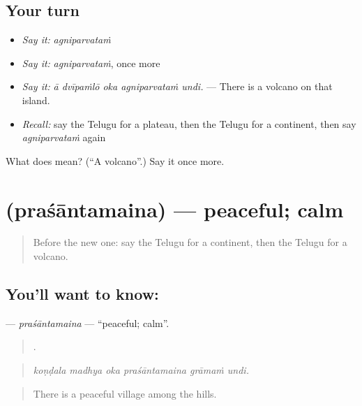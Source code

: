 \subsection*{Your turn}
\begin{itemize}
\raggedright
  \item \emph{Say it:} \emph{agniparvataṁ}
  \item \emph{Say it:} \emph{agniparvataṁ}, once more
  \item \emph{Say it:} \emph{ā dvīpaṁlō oka agniparvataṁ undi.} — There is a volcano on that island.
  \item \emph{Recall:} say the Telugu for a plateau, then the Telugu for a continent, then say \emph{agniparvataṁ} again
\end{itemize}

\begin{tcolorbox}[breakable,colback=teal!4,colframe=teal!35!black,title={Before you move on}]
What does  mean? (\textquotedblleft{}A volcano\textquotedblright{}.) Say it once more.
\end{tcolorbox}
\section[\texorpdfstring{\te{ప్రశాంతమైన} (praśāntamaina)}{ప్రశాంతమైన (praśāntamaina)}]{ (praśāntamaina) — peaceful; calm}

\label{lesson:TE-C474-prasantamaina}



\begin{quote}
Before the new one: say the Telugu for a continent, then the Telugu for a volcano.
\end{quote}

\subsection*{You'll want to know: }
\textbf{} — \emph{praśāntamaina} — \textquotedblleft{}peaceful; calm\textquotedblright{}.

\begin{quote}
     .
\end{quote}

\begin{quote}
\emph{koṇḍala madhya oka praśāntamaina grāmaṁ undi.}
\end{quote}

\begin{quote}
There is a peaceful village among the hills.
\end{quote}

